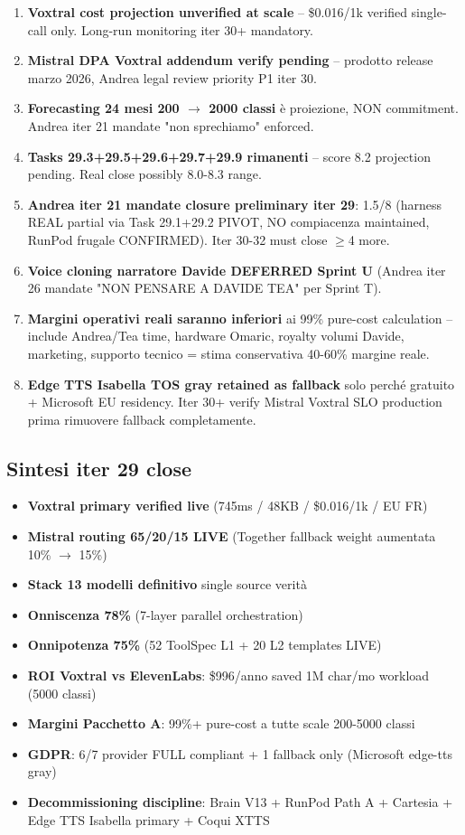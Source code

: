 \documentclass[12pt,a4paper]{article}
\begin{document}
\begin{enumerate}[leftmargin=*]
  \item \textbf{Voxtral cost projection unverified at scale} -- \$0.016/1k verified single-call only. Long-run monitoring iter 30+ mandatory.
  \item \textbf{Mistral DPA Voxtral addendum verify pending} -- prodotto release marzo 2026, Andrea legal review priority P1 iter 30.
  \item \textbf{Forecasting 24 mesi 200 $\rightarrow$ 2000 classi} è proiezione, NON commitment. Andrea iter 21 mandate "non sprechiamo" enforced.
  \item \textbf{Tasks 29.3+29.5+29.6+29.7+29.9 rimanenti} -- score 8.2 projection pending. Real close possibly 8.0-8.3 range.
  \item \textbf{Andrea iter 21 mandate closure preliminary iter 29}: 1.5/8 (harness REAL partial via Task 29.1+29.2 PIVOT, NO compiacenza maintained, RunPod frugale CONFIRMED). Iter 30-32 must close $\geq$4 more.
  \item \textbf{Voice cloning narratore Davide DEFERRED Sprint U} (Andrea iter 26 mandate "NON PENSARE A DAVIDE TEA" per Sprint T).
  \item \textbf{Margini operativi reali saranno inferiori} ai 99\% pure-cost calculation -- include Andrea/Tea time, hardware Omaric, royalty volumi Davide, marketing, supporto tecnico = stima conservativa 40-60\% margine reale.
  \item \textbf{Edge TTS Isabella TOS gray retained as fallback} solo perché gratuito + Microsoft EU residency. Iter 30+ verify Mistral Voxtral SLO production prima rimuovere fallback completamente.
\end{enumerate}

\subsection*{Sintesi iter 29 close}

\begin{itemize}[leftmargin=*]
  \item \textbf{Voxtral primary verified live} (745ms / 48KB / \$0.016/1k / EU FR)
  \item \textbf{Mistral routing 65/20/15 LIVE} (Together fallback weight aumentata 10\% $\rightarrow$ 15\%)
  \item \textbf{Stack 13 modelli definitivo} single source verità
  \item \textbf{Onniscenza 78\%} (7-layer parallel orchestration)
  \item \textbf{Onnipotenza 75\%} (52 ToolSpec L1 + 20 L2 templates LIVE)
  \item \textbf{ROI Voxtral vs ElevenLabs}: \$996/anno saved 1M char/mo workload (5000 classi)
  \item \textbf{Margini Pacchetto A}: 99\%+ pure-cost a tutte scale 200-5000 classi
  \item \textbf{GDPR}: 6/7 provider FULL compliant + 1 fallback only (Microsoft edge-tts gray)
  \item \textbf{Decommissioning discipline}: Brain V13 + RunPod Path A + Cartesia + Edge TTS Isabella primary + Coqui XTTS
\end{itemize}
\end{document}
